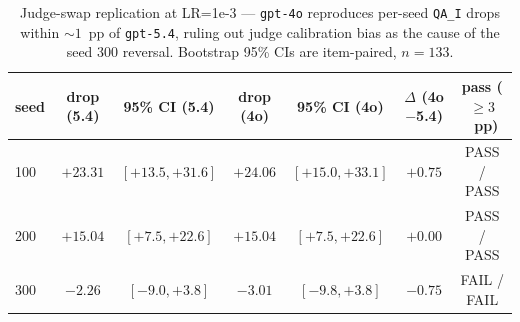 
\begin{table}[t]
\centering
\caption{Judge-swap replication at LR=1e-3 --- \texttt{gpt-4o} reproduces per-seed \texttt{QA\_I} drops within $\sim 1$~pp of \texttt{gpt-5.4}, ruling out judge calibration bias as the cause of the seed 300 reversal. Bootstrap 95\% CIs are item-paired, $n=133$.}
\label{tab:c1_judge_swap_replication}
\begin{tabular}{lcccccc}
\toprule
seed & drop (5.4) & 95\% CI (5.4) & drop (4o) & 95\% CI (4o) & $\Delta$ (4o$-$5.4) & pass ($\ge 3$~pp) \\
\midrule
100 & $+23.31$ & $[+13.5, +31.6]$ & $+24.06$ & $[+15.0, +33.1]$ & $+0.75$ & PASS / PASS \\
200 & $+15.04$ & $[+7.5, +22.6]$ & $+15.04$ & $[+7.5, +22.6]$ & $+0.00$ & PASS / PASS \\
300 & $−2.26$ & $[-9.0, +3.8]$ & $−3.01$ & $[-9.8, +3.8]$ & $−0.75$ & FAIL / FAIL \\

\bottomrule
\end{tabular}
\end{table}
